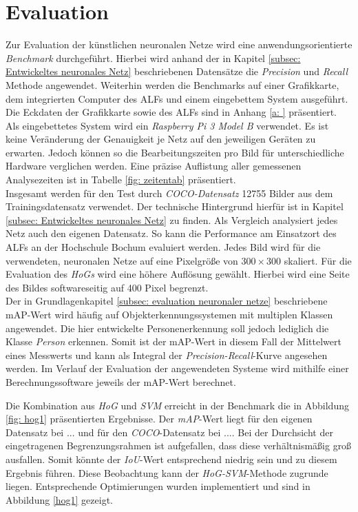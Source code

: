 \chapter{Evaluation}
\label{ch: Verifikation}
Zur Evaluation der künstlichen neuronalen Netze wird eine anwendungsorientierte \textit{Benchmark} durchgeführt. Hierbei wird anhand der in Kapitel \ref{subsec: Entwickeltes neuronales Netz} beschriebenen Datensätze die \textit{Precision} und \textit{Recall} Methode angewendet. Weiterhin werden die Benchmarks auf einer Grafikkarte, dem integrierten Computer des ALFs und einem eingebettem System ausgeführt. Die Eckdaten der Grafikkarte sowie des ALFs sind in Anhang \ref{a: } präsentiert. Als eingebettetes System wird ein \textit{Raspberry Pi 3 Model B} verwendet. Es ist keine Veränderung der Genauigkeit je Netz auf den jeweiligen Geräten zu erwarten. Jedoch können so die Bearbeitungszeiten pro Bild für unterschiedliche Hardware verglichen werden. Eine präzise Auflistung aller gemessenen Analysezeiten ist in Tabelle \ref{fig: zeitentab} präsentiert. \\

Insgesamt werden für den Test durch \textit{COCO-Datensatz} 12755 Bilder aus dem Trainingsdatensatz verwendet. Der technische Hintergrund hierfür ist in Kapitel \ref{subsec: Entwickeltes neuronales Netz} zu finden. Als Vergleich analysiert jedes Netz auch den eigenen Datensatz. So kann die Performance am Einsatzort des ALFs an der Hochschule Bochum evaluiert werden. Jedes Bild wird für die verwendeten, neuronalen Netze auf eine Pixelgröße von $300 \times 300$ skaliert. Für die Evaluation des \textit{HoGs} wird eine höhere Auflösung gewählt. Hierbei wird eine Seite des Bildes softwareseitig auf 400 Pixel begrenzt.\\

Der in Grundlagenkapitel \ref{subsec: evaluation neuronaler netze} beschriebene mAP-Wert wird häufig auf Objekterkennungssystemen mit multiplen Klassen angewendet. Die hier entwickelte Personenerkennung soll jedoch lediglich die Klasse \textit{Person} erkennen. Somit ist der mAP-Wert in diesem Fall der Mittelwert eines Messwerts und kann als Integral der \textit{Precision-Recall}-Kurve angesehen werden. Im Verlauf der Evaluation der angewendeten Systeme wird mithilfe einer Berechnungssoftware jeweils der mAP-Wert berechnet.
 


Die Kombination aus \textit{HoG} und \textit{SVM} erreicht in der Benchmark die in Abbildung \ref{fig: hog1} präsentierten Ergebnisse. Der \textit{mAP}-Wert liegt für den eigenen Datensatz bei ... und für den \textit{COCO}-Datensatz bei .... Bei der Durchsicht der eingetragenen Begrenzungsrahmen ist aufgefallen, dass diese verhältnismäßig groß ausfallen. Somit könnte der \textit{IoU}-Wert entsprechend niedrig sein und zu diesem Ergebnis führen. Diese Beobachtung kann der \textit{HoG-SVM}-Methode zugrunde liegen. Entsprechende Optimierungen wurden implementiert und sind in Abbildung \ref{hog1} gezeigt. 


